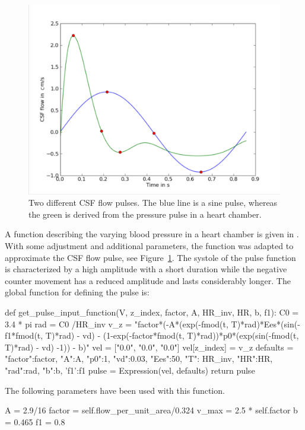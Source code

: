 \begin{figure}
  \centering
  \includegraphics[width=\largefig]{chapters/hentschel/pdf/sin_pulse.pdf}
  \caption{Two different CSF flow pulses. The blue line is a sine pulse,
    whereas the green is derived from the pressure pulse in a heart
    chamber.}
  \label{fig:sin_pulse}
\end{figure}

A function describing the varying blood pressure in a heart chamber is
given in \citet{SmithChase2ShawEtAl2006}.  With some adjustment and
additional parameters, the function was adapted to approximate the CSF
flow pulse, see Figure~\ref{fig:sin_pulse}.  The systole of the pulse
function is characterized by a high amplitude with a short duration
while the negative counter movement has a reduced amplitude and lasts
considerably longer.  The global function for defining the pulse is:
\begin{python}
def get_pulse_input_function(V, z_index, factor, A, HR_inv, HR, b, f1):
    C0 = 3.4 * pi
    rad = C0 /HR_inv
    v_z = "factor*(-A*(exp(-fmod(t, T)*rad)*Ees*(sin(-f1*fmod(t, T)*rad) - vd)
     - (1-exp(-factor*fmod(t, T)*rad))*p0*(exp(sin(-fmod(t, T)*rad) - vd) -1)) - b)"
    vel = ["0.0", "0.0", "0.0"]
    vel[z_index] = v_z
   defaults = {"factor":factor, "A":A, "p0":1, "vd":0.03, "Ees":50,
               "T": HR_inv, "HR":HR, "rad":rad, "b":b, 'f1':f1}
    pulse = Expression(vel, defaults)
    return pulse
\end{python}
The following parameters have been used with this function.
\begin{python}
A = 2.9/16
factor = self.flow_per_unit_area/0.324
v_max = 2.5 * self.factor
b = 0.465
f1 = 0.8
\end{python}


